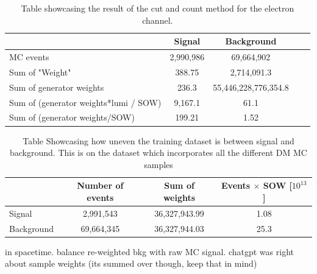 \documentclass[14pt, a4paper]{book}
\begin{document}
\clearpage
\begin{table}[!h]
   \centering
   \begin{tabular}{l|c|c|c|r}\midrule\midrule
                                                & Signal     & Background \\\midrule
        MC events                               & 2,990,986  & 69,664,902 \\
        Sum of "Weight"                         & 388.75     & 2,714,091.3 \\
        Sum of generator weights                & 236.3      & 55,446,228,776,354.8 \\
        Sum of (generator weights*lumi / SOW)   & 9,167.1    & 61.1 \\
        Sum of (generator weights/SOW)          & 199.21    & 1.52 \\\midrule\midrule
   \end{tabular}
   \caption[Cut and count significance ee]{Table showcasing the result of the cut and count method for the electron channel.}
\end{table}

\begin{table}[!h]
    \centering
    \begin{tabular}{l|c|c|c}\midrule\midrule
                    & Number of events & Sum of weights & Events $\times$ SOW [$10^{13}$]\\\midrule
         Signal     & 2,991,543        & 36,327,943.99  & 1.08\\
         Background & 69,664,345       & 36,327,944.03  & 25.3 \\ \midrule\midrule
    \end{tabular}
    \caption[Unbalanced DM training dataset]{Table Showcasing how uneven the training dataset is between signal and background. This is on the dataset which incorporates all the different DM MC samples}
    \label{tab:UnbalancedDMTraining}
\end{table}
in spacetime.
balance re-weighted bkg with raw MC signal. chatgpt was right about sample weights (its summed over though, keep that in mind)
\clearpage
\printbibliography
\end{document}
